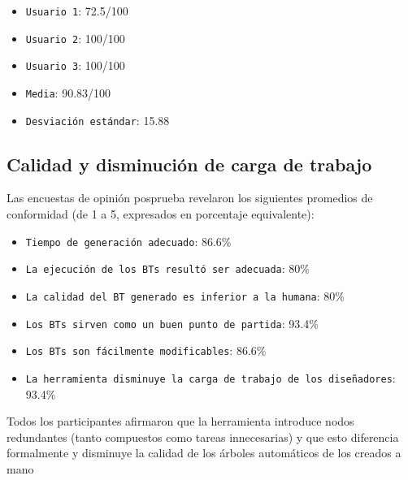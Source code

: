 \begin{itemize}
    \item \texttt{Usuario 1}: 72.5/100
    \item \texttt{Usuario 2}: 100/100
    \item \texttt{Usuario 3}: 100/100
    \item \texttt{Media}: 90.83/100
    \item \texttt{Desviación estándar}: 15.88
\end{itemize}

\subsection{Calidad y disminución de carga de trabajo}
Las encuestas de opinión posprueba revelaron los siguientes promedios de conformidad (de 1 a 5, expresados en porcentaje equivalente):

\begin{itemize}
    \item \texttt{Tiempo de generación adecuado}: 86.6\%
    \item \texttt{La ejecución de los BTs resultó ser adecuada}: 80\%
    \item \texttt{La calidad del BT generado es inferior a la humana}: 80\%
    \item \texttt{Los BTs sirven como un buen punto de partida}: 93.4\%
    \item \texttt{Los BTs son fácilmente modificables}: 86.6\%
    \item \texttt{La herramienta disminuye la carga de trabajo de los diseñadores}: 93.4\%
\end{itemize}

Todos los participantes afirmaron que la herramienta introduce nodos redundantes (tanto compuestos como tareas innecesarias) y que esto diferencia formalmente y disminuye la calidad de los árboles automáticos de los creados a mano


